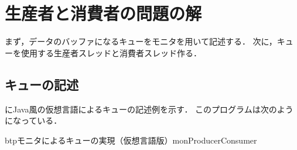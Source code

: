 \section{生産者と消費者の問題の解}
まず，データのバッファになるキューをモニタを用いて記述する．
次に，キューを使用する生産者スレッドと消費者スレッド作る．

\subsection{キューの記述}
にJava風の仮想言語によるキューの記述例を示す．
このプログラムは次のようになっている．

\begin{myfig}{btp}{モニタによるキューの実現（仮想言語版）}{monProducerConsumer}

\end{myfig}

